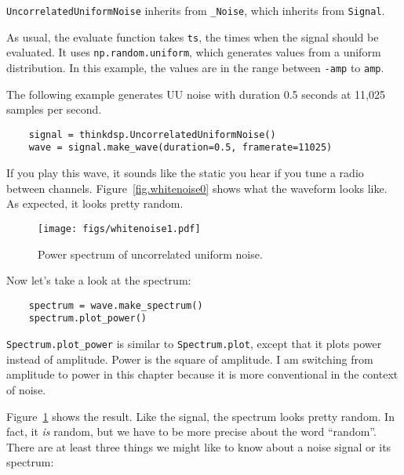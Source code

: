 {\tt UncorrelatedUniformNoise} inherits from \verb"_Noise", which
inherits from {\tt Signal}.

As usual, the evaluate function takes {\tt ts}, the times when the
signal should be evaluated.  It uses
{\tt np.random.uniform}, which generates values from a
uniform distribution.  In this example, the values are in
the range between {\tt -amp} to {\tt amp}.

The following example generates UU noise with duration 0.5
seconds at 11,025 samples per second.

\begin{verbatim}
	signal = thinkdsp.UncorrelatedUniformNoise()
	wave = signal.make_wave(duration=0.5, framerate=11025)
\end{verbatim}

If you play this wave, it sounds like the static you hear if you tune
a radio between channels.  Figure~\ref{fig.whitenoise0} shows what the
waveform looks like.  As expected, it looks pretty random.

\begin{figure}
	\centerline{\texttt{[image: figs/whitenoise1.pdf]}}
	\caption{Power spectrum of uncorrelated uniform noise.}
	\label{fig.whitenoise1}
\end{figure}

Now let's take a look at the spectrum:

\begin{verbatim}
	spectrum = wave.make_spectrum()
	spectrum.plot_power()
\end{verbatim}

\verb"Spectrum.plot_power" is similar to \verb"Spectrum.plot",
except that it plots power instead of amplitude.
Power is the square of amplitude.
I am switching from amplitude to power in this chapter because
it is more conventional in the context of noise.

Figure~\ref{fig.whitenoise1} shows the result.  Like the signal, the
spectrum looks pretty random.  In fact, it {\em is} random, but we have to
be more precise about the word ``random''.  There are at least three
things we might like to know about a noise signal or its spectrum:

